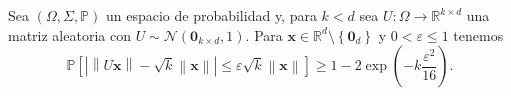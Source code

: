 \begin{theorem}\label{thm:projection}
	Sea $\left(\Omega,\Sigma,\mathbb{P}\right)$ un espacio de
	probabilidad y, para $k<d$ sea
	$U\colon\Omega\to\mathbb{R}^{k\times d}$ una matriz aleatoria con
	$U\sim\mathcal{N}\left(\symbf{0}_{k\times d},1\right)$.
	Para
	$\symbf{x}\in\mathbb{R}^{d}\setminus\left\{\symbf{0}_{d}\right\}$ y
	$0<\varepsilon\leq 1$ tenemos
	\begin{equation*}
		\mathbb{P}
		\left[
			\left|
			\left\|
			U\symbf{x}
			\right\|-
			\sqrt{k}
			\left\|
			\symbf{x}
			\right\|
			\right|\leq
			\varepsilon\sqrt{k}
			\left\|
			\symbf{x}
			\right\|
			\right]\geq
		1-2\exp\left(-k\frac{\varepsilon^{2}}{16}\right).
	\end{equation*}
\end{theorem}


